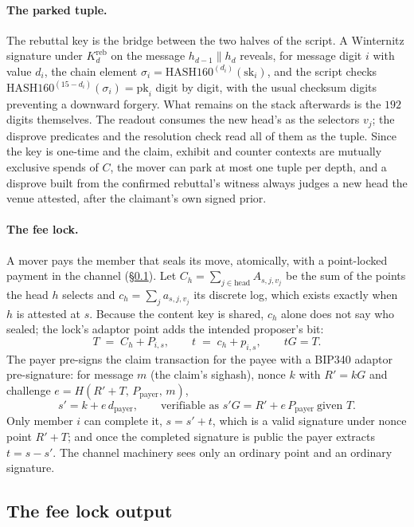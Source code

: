 \documentclass[11pt]{article}
\begin{document}
\paragraph{The parked tuple.}
The rebuttal key is the bridge between the two halves of the script. A
Winternitz signature under $K^{\mathrm{reb}}_d$ on the message
$h_{d-1}\|h_d$ reveals, for message digit $i$ with value $d_i$, the
chain element $\sigma_i = \mathrm{HASH160}^{(d_i)}(\mathrm{sk}_i)$, and
the script checks $\mathrm{HASH160}^{(15-d_i)}(\sigma_i) =
\mathrm{pk}_i$ digit by digit, with the usual checksum digits
preventing a downward forgery. What remains on the stack afterwards is
the $192$ digits themselves. The readout consumes the new head's as the
selectors $v_j$; the disprove predicates and the resolution check read
all of them as the tuple. Since the key is one-time and the claim,
exhibit and counter contexts are mutually exclusive spends of $C$, the
mover can park at most one tuple per depth, and a disprove built from
the confirmed rebuttal's witness always judges a new head the venue
attested, after the claimant's own signed prior.

\paragraph{The fee lock.}
A mover pays the member that seals its move, atomically, with a
point-locked payment in the channel (\S\ref{sec:graph:fee}). Let
$C_h = \sum_{j \in \text{head}} A_{s,j,v_j}$ be the sum of the points
the head $h$ selects and $c_h = \sum_j a_{s,j,v_j}$ its discrete log,
which exists exactly when $h$ is attested at $s$. Because the content
key is shared, $c_h$ alone does not say who sealed; the lock's adaptor
point adds the intended proposer's bit:
\[
  T \;=\; C_h + P_{i,s}, \qquad t \;=\; c_h + p_{i,s}, \qquad tG = T.
\]
The payer pre-signs the claim transaction for the payee with a BIP340
adaptor pre-signature: for message $m$ (the claim's sighash), nonce
$k$ with $R' = kG$ and challenge
$e = H(R'+T,\,P_{\text{payer}},\,m)$,
\[
  s' = k + e\,d_{\text{payer}}, \qquad
  \text{verifiable as } s'G = R' + e\,P_{\text{payer}}\ \text{given } T.
\]
Only member $i$ can complete it, $s = s' + t$, which is a valid
signature under nonce point $R'+T$; and once the completed signature is
public the payer extracts $t = s - s'$. The channel machinery sees only
an ordinary point and an ordinary signature.

\subsection{The fee lock output}
\label{sec:graph:fee}
\end{document}
